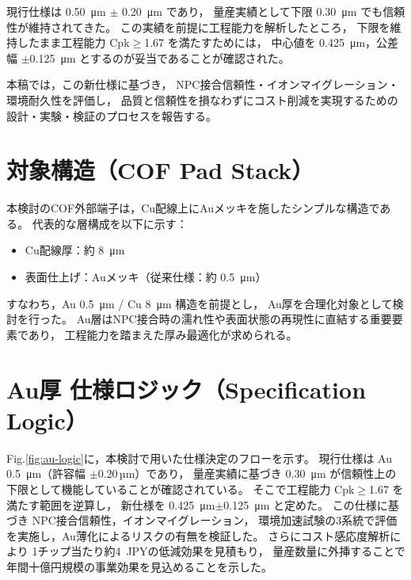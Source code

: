 \documentclass[conference]{IEEEtran}
\begin{document}
現行仕様は \SI{0.50}{\micro\meter} $\pm$ \SI{0.20}{\micro\meter} であり，
量産実績として下限 \SI{0.30}{\micro\meter} でも信頼性が維持されてきた。
この実績を前提に工程能力を解析したところ，
下限を維持したまま工程能力 Cpk$\geq$1.67 を満たすためには，
中心値を \SI{0.425}{\micro\meter}，公差幅 $\pm$\SI{0.125}{\micro\meter} とするのが妥当であることが確認された。

本稿では，この新仕様に基づき，
NPC接合信頼性・イオンマイグレーション・環境耐久性を評価し，
品質と信頼性を損なわずにコスト削減を実現するための
設計・実験・検証のプロセスを報告する。

\section{対象構造（COF Pad Stack）}
本検討のCOF外部端子は，Cu配線上にAuメッキを施したシンプルな構造である。
代表的な層構成を以下に示す：

\begin{itemize}
  \item Cu配線厚：約 \SI{8}{\micro\meter}
  \item 表面仕上げ：Auメッキ（従来仕様：約 \SI{0.5}{\micro\meter}）
\end{itemize}

すなわち，Au \SI{0.5}{\micro\meter} / Cu \SI{8}{\micro\meter} 構造を前提とし，
Au厚を合理化対象として検討を行った。  
Au層はNPC接合時の濡れ性や表面状態の再現性に直結する重要要素であり，
工程能力を踏まえた厚み最適化が求められる。

\section{Au厚 仕様ロジック（Specification Logic）}
Fig.\ref{fig:au-logic}に，本検討で用いた仕様決定のフローを示す。
現行仕様は Au \SI{0.5}{\micro\meter}（許容幅 $\pm$0.20\,µm）であり，
量産実績に基づき \SI{0.30}{\micro\meter} が信頼性上の下限として機能していることが確認されている。
そこで工程能力 Cpk$\geq$1.67 を満たす範囲を逆算し，
新仕様を \SI{0.425}{\micro\meter}$\pm$\SI{0.125}{\micro\meter} と定めた。
この仕様に基づき NPC接合信頼性，イオンマイグレーション，
環境加速試験の3系統で評価を実施し，Au薄化によるリスクの有無を検証した。
さらにコスト感応度解析により 1チップ当たり約\SI{4}{JPY}の低減効果を見積もり，
量産数量に外挿することで年間十億円規模の事業効果を見込めることを示した。
\end{document}
